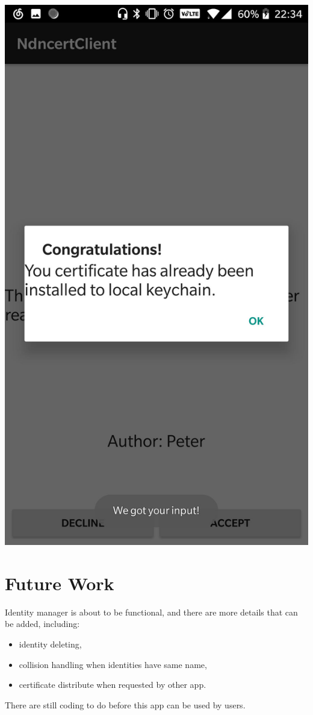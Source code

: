 \documentclass[a0,portrait]{poster}
\begin{document}
\begin{multicols}{2}
\begin{minipage}[b]{\linewidth}
	\includegraphics[width=0.24\linewidth]{figures/download.jpg}
\end{minipage}






\section*{Future Work}

\par 
	Identity manager is about to be functional, and there are more details that can be added, including:
	\begin{itemize}
		\item identity deleting, 
		\item collision handling when identities have same name,
		\item certificate distribute when requested by other app.
	\end{itemize} 
	There are still coding to do before this app can be used by users.



\end{multicols}
\end{document}
